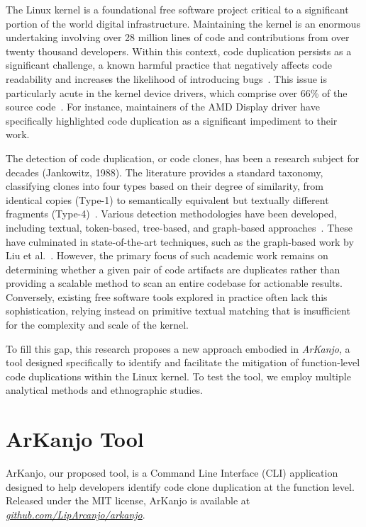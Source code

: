 \documentclass[conference]{IEEEtran}
\begin{document}
The Linux kernel is a foundational free software project 
critical to a significant portion of the world digital infrastructure. Maintaining 
the kernel is an enormous undertaking involving over 28 million lines of code 
and contributions from over twenty thousand developers. Within this context, code 
duplication persists as a significant challenge, a known harmful practice that 
negatively affects code readability and increases the likelihood of introducing
bugs~\cite{harmone,harmtwo}. This issue is particularly acute in the 
kernel device drivers, which comprise over 66\% of the source code~\cite{marcelo}. 
For instance, maintainers of the AMD Display driver have specifically highlighted code 
duplication as a significant impediment to their work.

The detection of code duplication, or code clones, has been a research subject for 
decades (Jankowitz, 1988). The literature provides a standard taxonomy, classifying 
clones into four types based on their degree of similarity, from identical copies 
(Type-1) to semantically equivalent but textually different fragments (Type-4)~\cite{litreview}. 
Various detection methodologies have been developed, including textual, token-based, 
tree-based, and graph-based approaches~\cite{litreview}. These have culminated in 
state-of-the-art techniques, such as the graph-based work by Liu et al.~\cite{tailor}. 	
However, the primary focus of such academic work remains on determining whether a given 
pair of code artifacts are duplicates rather than providing a scalable method to scan 
an entire codebase for actionable results. Conversely, existing free software tools explored 
in practice often lack this sophistication, relying instead on primitive textual matching 
that is insufficient for the complexity and scale of the kernel.

To fill this gap, this research proposes a new approach embodied in \textit{ArKanjo}, a tool 
designed specifically to identify and facilitate the mitigation of function-level code 
duplications within the Linux kernel. To test the tool, we employ multiple analytical 
methods and ethnographic studies.


\section{ArKanjo Tool}

ArKanjo, our proposed tool, is a Command Line Interface (CLI) application designed to
help developers identify code clone duplication at the function level. Released under the
MIT license, ArKanjo is available at \textit{\url{github.com/LipArcanjo/arkanjo}}.
\end{document}
